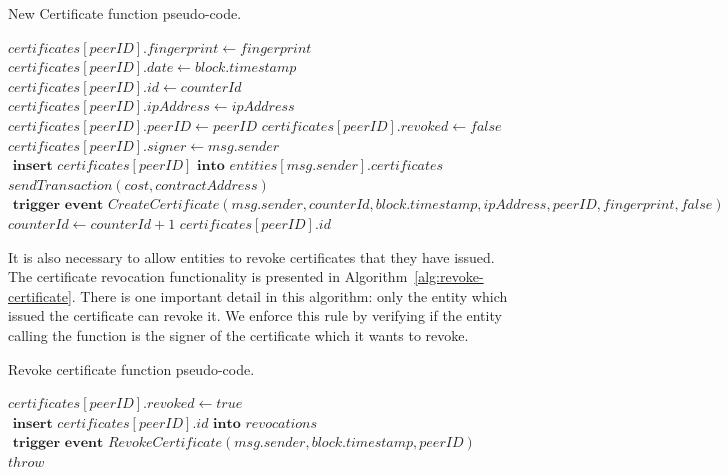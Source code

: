 \begin{algorithm}[h!]
  \caption{New Certificate function pseudo-code.}
\label{alg:new-certificate}
  \begin{algorithmic}[1]
      \State $certificates[peerID].fingerprint \gets fingerprint$
      \State $certificates[peerID].date \gets block.timestamp$
      \State $certificates[peerID].id \gets counterId$
      \State $certificates[peerID].ipAddress \gets ipAddress$
      \State $certificates[peerID].peerID \gets peerID$
      \State $certificates[peerID].revoked \gets false$
      \State $certificates[peerID].signer \gets msg.sender$
      \State 
      \State $\textbf{ insert } certificates[peerID] \textbf{ into } entities[msg.sender].certificates$
      \State $sendTransaction(cost, contractAddress)$ 
      \State 
      \State $\textbf{ trigger event } CreateCertificate(msg.sender, counterId, block.timestamp,\allowbreak ipAddress, peerID, fingerprint, false)$
      \State
      \State $counterId \gets counterId + 1$
      \State 
      \State 
      \Return $certificates[peerID].id$
    \EndFunction
  \end{algorithmic}
\end{algorithm}


It is also necessary to allow entities to revoke certificates that they have issued.
The certificate revocation functionality is presented in Algorithm~\ref{alg:revoke-certificate}.
There is one important detail in this algorithm: only the entity which issued the certificate can revoke it.
We enforce this rule by verifying if the entity calling the function is the signer of the certificate which it wants to revoke.

\begin{algorithm}[h!]
  \caption{Revoke certificate function pseudo-code.}
  \label{alg:revoke-certificate}
  \begin{algorithmic}[1]
        \State $certificates[peerID].revoked \gets true$
        \State $\textbf{ insert } certificates[peerID].id \textbf{ into } revocations$
        \State $\textbf{ trigger event } RevokeCertificate(msg.sender, block.timestamp, peerID)$
      \Else
        \State $throw$
      \EndIf
    \EndFunction
  \end{algorithmic}
\end{algorithm}



